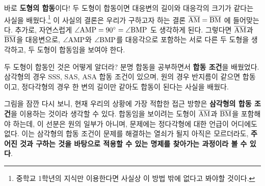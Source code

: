바로 \textbf{도형의 합동}이다! 두 도형이 합동이면 대응변의 길이와 대응각의 크기가 같다는 사실을 배웠다.\footnote{중학교 1학년의 지식만 이용한다면 사실상 이 방법 밖에 없다고 봐야할 것이다.} 이 사실의 결론은 우리가 구하고자 하는 결론 \(\overline{\rm{AM}} = \overline{\rm{BM}}\) 에 들어맞는다. 추가로, 자연스럽게 \(\angle \rm{AMP} = 90^\circ = \angle \rm{BMP}\) 도 생각하게 된다. 그렇다면 \(\overline{\rm{AM}}\)과 \(\overline{\rm{BM}}\)을 대응변으로, \(\angle \rm{AMP}\)와 \(\angle \rm{BMP}\)를 대응각으로 포함하는 서로 다른 두 도형을 생각하고, 두 도형이 합동임을 보여야 한다.

두 도형이 합동인 것은 어떻게 알더라? 분명 합동을 공부하면서 \textbf{합동 조건}을 배웠었다. 삼각형의 경우 SSS, SAS, ASA 합동 조건이 있으며, 원의 경우 반지름이 같으면 합동이고, 정다각형의 경우 한 변의 길이만 같아도 합동이 된다는 사실을 배웠다.

그림을 잠깐 다시 보니, 현재 우리의 상황에 가장 적합한 접근 방향은 \textbf{삼각형의 합동 조건}을 이용하는 것이라 생각할 수 있다. 합동임을 보이려는 도형이 \(\overline{\rm{AM}}\)과 \(\overline{\rm{BM}}\)을 포함해야 하는데, 이 선분은 원의 일부가 아니며, 문제에는 정다각형에 대한 언급이 어디에도 없다. 이는 삼각형의 합동 조건이 문제를 해결하는 열쇠가 될지 아직은 모르더라도, \textbf{주어진 것과 구하는 것을 바탕으로 적용할 수 있는 명제를 찾아가는 과정이라 볼 수 있다}.

\begin{wrapfigure}{R}{0.36\textwidth}
\end{wrapfigure}

